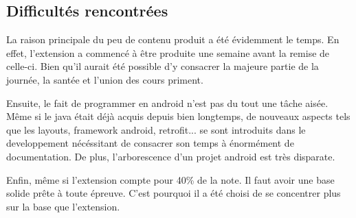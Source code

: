 \subsection{Difficultés rencontrées}
\begin{flushleft}
La raison principale du peu de contenu produit a été évidemment le temps. En effet, l'extension a commencé à être produite une semaine avant la remise de celle-ci. Bien qu'il aurait été possible d'y consacrer la majeure partie de la journée, la santée et l'union des cours priment.
\end{flushleft}
\begin{flushleft}
Ensuite, le fait de programmer en android n'est pas du tout une tâche aisée. Même si le java était déjà acquis depuis bien longtemps, de nouveaux aspects tels que les layouts, framework android, retrofit... se sont introduits dans le developpement nécéssitant de consacrer son temps à énormément de documentation. De plus, l'arborescence d'un projet android est très disparate.
\end{flushleft}
\begin{flushleft}
Enfin, même si l'extension compte pour 40\% de la note. Il faut avoir une base solide prête à toute épreuve. C'est pourquoi il a été choisi de se concentrer plus sur la base que l'extension.
\end{flushleft}